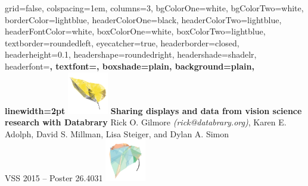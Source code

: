\documentclass[landscape,final,a0paper,fontscale=0.285]{baposter}
\begin{document}


\begin{poster}%
  {
  grid=false,
  colspacing=1em,
  columns=3,
  bgColorOne=white,
  bgColorTwo=white,
  borderColor=lightblue,
  headerColorOne=black,
  headerColorTwo=lightblue,
  headerFontColor=white,
  boxColorOne=white,
  boxColorTwo=lightblue,
  textborder=roundedleft,
  eyecatcher=true,
  headerborder=closed,
  headerheight=0.1\textheight,
  headershape=roundedright,
  headershade=shadelr,
  headerfont=\Large\bf\textsc, %
  textfont={\setlength{\parindent}{1.5em}},
  boxshade=plain,
  background=plain,
  linewidth=2pt
  }
  {
    \includegraphics[height=5em]{img/datavyu-leaf-large.png}
  } 
  {\bf{Sharing displays and data from vision science research with Databrary} }
  {Rick O. Gilmore \emph{(rick@databrary.org)}, Karen E. Adolph, David S. Millman, Lisa Steiger, and Dylan A. Simon \\
  VSS 2015 -- Poster 26.4031}
  {
    \includegraphics[height=5em]{img/databrary-leaf-large.png}
  }



\end{poster}
\end{document}
